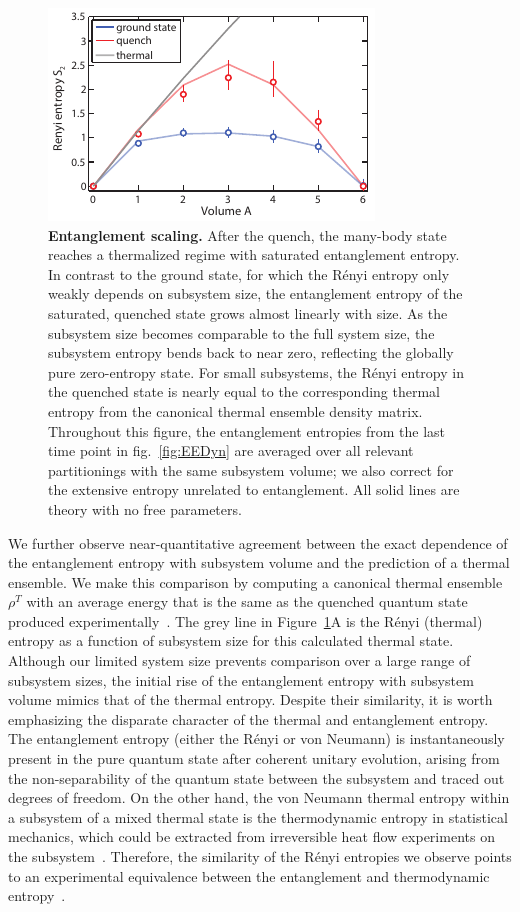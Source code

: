 \begin{figure}[t]
	\centering
	\includegraphics[scale=1.5]{figures/ETH_volumeLaw.pdf}
	\caption{{\bf Entanglement scaling. } After the quench, the many-body state reaches a thermalized regime with saturated entanglement entropy. In contrast to the ground state, for which the R\'{e}nyi entropy only weakly depends on subsystem size, the entanglement entropy of the saturated, quenched state grows almost linearly with size. As the subsystem size becomes comparable to the full system size, the subsystem entropy bends back to near zero, reflecting the globally pure zero-entropy state. For small subsystems, the R\'{e}nyi entropy in the quenched state is nearly equal to the corresponding thermal entropy from the canonical thermal ensemble density matrix. Throughout this figure, the entanglement entropies from the last time point in fig.~\ref{fig:EEDyn} are averaged over all relevant partitionings with the same subsystem volume; we also correct for the extensive entropy unrelated to entanglement. All solid lines are theory with no free parameters.}
	\label{fig:volume}
\end{figure}

We further observe near-quantitative agreement between the exact dependence of the entanglement entropy with subsystem volume and the prediction of a thermal ensemble. We make this comparison by computing a canonical thermal ensemble $\rho^T$ with an average energy that is the same as the quenched quantum state produced experimentally~\cite{Grover2015}. The grey line in Figure~\ref{fig:volume}A is the R\'{e}nyi (thermal) entropy as a function of subsystem size for this calculated thermal state. Although our limited system size prevents comparison over a large range of subsystem sizes, the initial rise of the entanglement entropy with subsystem volume mimics that of the thermal entropy. Despite their similarity, it is worth emphasizing the disparate character of the thermal and entanglement entropy. The entanglement entropy (either the R\'{e}nyi or von Neumann) is instantaneously present in the pure quantum state after coherent unitary evolution, arising from the non-separability of the quantum state between the subsystem and traced out degrees of freedom. On the other hand, the von Neumann thermal entropy within a subsystem of a mixed thermal state is the thermodynamic entropy in statistical mechanics, which could be extracted from irreversible heat flow experiments on the subsystem~\cite{Deutsch2013}. Therefore, the similarity of the R\'{e}nyi  entropies we observe points to an experimental equivalence between the entanglement and thermodynamic entropy~\cite{Grover2014,Grover2015}.

